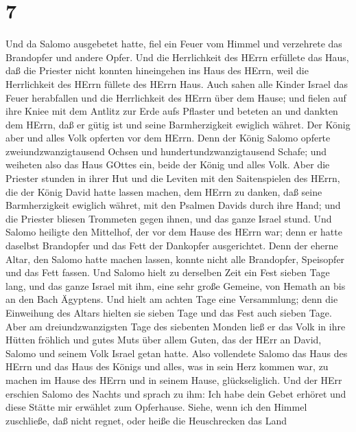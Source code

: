 \hypertarget{section-6}{%
\section{7}\label{section-6}}

 Und da Salomo ausgebetet hatte, fiel ein Feuer vom Himmel
und verzehrete das Brandopfer und andere Opfer. Und die Herrlichkeit des
HErrn erfüllete das Haus,  daß die Priester nicht konnten
hineingehen ins Haus des HErrn, weil die Herrlichkeit des HErrn füllete
des HErrn Haus.  Auch sahen alle Kinder Israel das Feuer
herabfallen und die Herrlichkeit des HErrn über dem Hause; und fielen
auf ihre Kniee mit dem Antlitz zur Erde aufs Pflaster und beteten an und
dankten dem HErrn, daß er gütig ist und seine Barmherzigkeit ewiglich
währet.  Der König aber und alles Volk opferten vor dem
HErrn.  Denn der König Salomo opferte zweiundzwanzigtausend
Ochsen und hundertundzwanzigtausend Schafe; und weiheten also das Haus
GOttes ein, beide der König und alles Volk.  Aber die
Priester stunden in ihrer Hut und die Leviten mit den Saitenspielen des
HErrn, die der König David hatte lassen machen, dem HErrn zu danken, daß
seine Barmherzigkeit ewiglich währet, mit den Psalmen Davids durch ihre
Hand; und die Priester bliesen Trommeten gegen ihnen, und das ganze
Israel stund.  Und Salomo heiligte den Mittelhof, der vor
dem Hause des HErrn war; denn er hatte daselbst Brandopfer und das Fett
der Dankopfer ausgerichtet. Denn der eherne Altar, den Salomo hatte
machen lassen, konnte nicht alle Brandopfer, Speisopfer und das Fett
fassen.  Und Salomo hielt zu derselben Zeit ein Fest sieben
Tage lang, und das ganze Israel mit ihm, eine sehr große Gemeine, von
Hemath an bis an den Bach Ägyptens.  Und hielt am achten
Tage eine Versammlung; denn die Einweihung des Altars hielten sie sieben
Tage und das Fest auch sieben Tage.  Aber am
dreiundzwanzigsten Tage des siebenten Monden ließ er das Volk in ihre
Hütten fröhlich und gutes Muts über allem Guten, das der HErr an David,
Salomo und seinem Volk Israel getan hatte.  Also vollendete
Salomo das Haus des HErrn und das Haus des Königs und alles, was in sein
Herz kommen war, zu machen im Hause des HErrn und in seinem Hause,
glückseliglich.  Und der HErr erschien Salomo des Nachts
und sprach zu ihm: Ich habe dein Gebet erhöret und diese Stätte mir
erwählet zum Opferhause.  Siehe, wenn ich den Himmel
zuschließe, daß nicht regnet, oder heiße die Heuschrecken das Land
